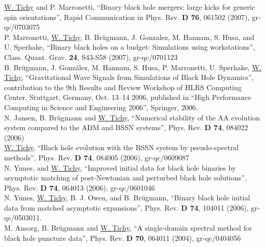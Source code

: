 \underline{W. Tichy} and P. Marronetti,
``Binary black hole mergers: large kicks for generic spin orientations'',
Rapid Communication in Phys. Rev. {\bf D 76}, 061502 (2007),
gr-qc/0703075
\\

P. Marronetti, \underline{W. Tichy}, B. Br\"ugmann, J. Gonzalez, M. Hannam, 
S. Husa, and U. Sperhake,
``Binary black holes on a budget: Simulations using workstations'',
Class. Quant. Grav. {\bf 24}, S43-S58 (2007), gr-qc/0701123
\\

B. Br\"ugmann, J. Gonz{\'a}lez, M. Hannam, S. Husa, P. Marronetti, 
U. Sperhake, \underline{W. Tichy},
``Gravitational Wave Signals from Simulations of Black Hole Dynamics'',
contribution to the 9th Results and Review Workshop of HLRS Computing Center, 
Stuttgart, Germany,
Oct. 13--14 2006, published in ``High Performance Computing in Science and 
Engineering 2006'', Springer, 2006.
\\

N. Jansen, B. Br\"ugmann and \underline{W. Tichy},
``Numerical stability of the AA evolution system compared to the ADM and
BSSN systems'', Phys. Rev. {\bf D 74}, 084022 (2006)
\\

\underline{W. Tichy}, 
``Black hole evolution with the BSSN system by pseudo-spectral methods'',
Phys. Rev. {\bf D 74}, 084005 (2006), gr-qc/0609087
\\

N. Yunes, and \underline{W. Tichy}, 
``Improved initial data for black hole binaries by asymptotic matching
of post-Newtonian and perturbed black hole solutions'',
Phys. Rev. {\bf D 74}, 064013 (2006), gr-qc/0601046
\\

N. Yunes, \underline{W. Tichy}, B. J. Owen, and B. Br\"ugmann, 
``Binary black hole initial data from matched asymptotic expansions'',
Phys. Rev. {\bf D 74}, 104011 (2006), gr-qc/0503011.
\\

M. Ansorg, B. Br\"ugmann and \underline{W. Tichy},
``A single-domain spectral method for black hole puncture data'',
Phys. Rev. {\bf D 70}, 064011 (2004), gr-qc/0404056
\\

